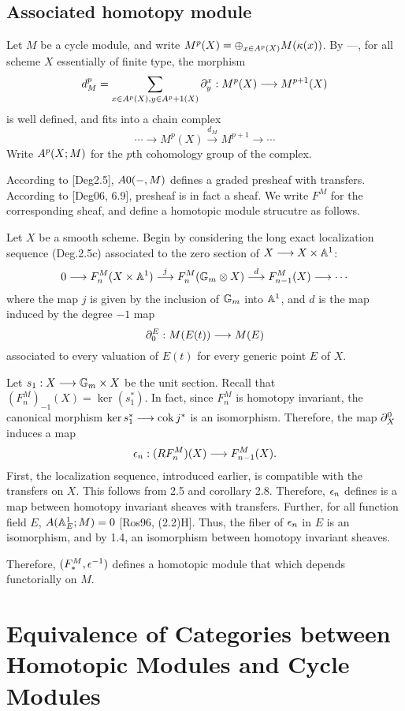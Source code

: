 \subsection{Associated homotopy module}

Let $M$ be a cycle module, and write $M^p(X) = \oplus_{x \in 
\subsch{p}{X}} M(\resf{x})$. By ---, for all scheme $X$ 
essentially of finite type, the morphism
\[
d_M^p = \sum_{x \in \subsch{p}{X}, y \in \subsch{p + 1}{X}} 
\ptres{x}{y} : M^p(X) \to M^{p + 1}(X)
\]
is well defined, and fits into a chain complex
\[
\cdots \to M^p(X) \stackrel{d_M}{\to} M^{p + 1} \to \cdots
\]
Write $\cmcohom^p(X; M)$ for the $p$th cohomology group of the 
complex.

According to [Deg2.5], $\cmcohom{0}(-,M)$ defines a graded 
presheaf with transfers. According to [Deg06, 6.9], presheaf is 
in fact a sheaf. We write $F^M$ for the corresponding sheaf, and 
define a homotopic module strucutre as follows.

Let $X$ be a smooth scheme. Begin by considering the long exact
localization sequence (Deg.2.5c) associated to the zero section of
$X \to X \times \A^1$:
\[
0 \to F^M_n(X \times \A^1) \stackrel{j}{\to} F^M_n(\Gmpt \otimes X) 
   \stackrel{d}{\to} F^M_{n - 1}(X) \to \cdots
\]
where the map $j$ is given by the inclusion of $\Gmpt$ into $\A^1$,
and $d$ is the map induced by the degree $-1$ map
\[
\ptres{E}{0}: M(E(t)) \to M(E)
\]
associated to every valuation of $E(t)$ for every generic point 
$E$ of $X$.

Let $s_1: X \to \Gmpt \times X$ be the unit section. Recall that
$(F^M_n)_{-1}(X) = \ker (s_1^*)$. In fact, since $F^M_n$ is 
homotopy invariant, the canonical morphism $\ker s_1^* \to
\cok j^*$ is an isomorphism. Therefore, the map $\ptres{0}{X}$ 
induces a map
\[
\loopCM_n : (RF^M_{n})(X) \to F^M_{n - 1}(X).
\]
First, the localization sequence, introduced earlier, is 
compatible with the transfers on $X$. This follows from 2.5 and 
corollary 2.8. Therefore, $\loopCM_n$ defines is a map between 
homotopy invariant sheaves with transfers. Further, for all 
function field $E$, $\cmcohom(\A^1_E; M) = 0$ [Ros96, (2.2)H]. 
Thus, the fiber of $\loopCM_n$ in $E$ is an isomorphism, and by 
1.4, an isomorphism between homotopy invariant sheaves.

Therefore, $(F^M_*, \loopCM^{-1})$ defines a homotopic module that
which depends functorially on $M$.

\section{Equivalence of Categories between Homotopic Modules and 
Cycle Modules}

